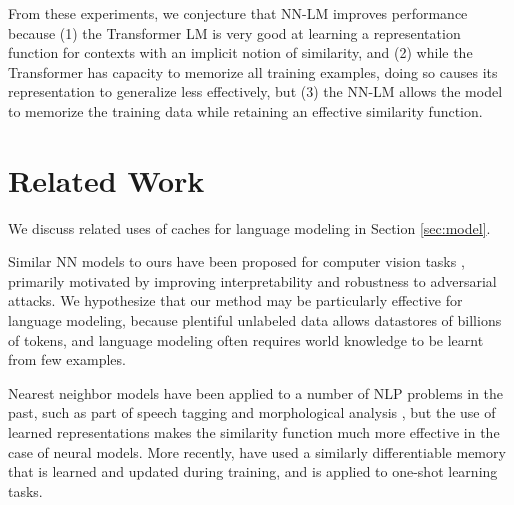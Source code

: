 \documentclass{article} \usepackage{iclr2020_conference,times}
\begin{document}
From these experiments, we conjecture that NN-LM improves performance because (1) the Transformer LM is very good at learning a representation function for contexts with an implicit notion of similarity, and (2) while the Transformer has capacity to memorize all training examples, doing so causes its representation to generalize less effectively, but (3) the NN-LM allows the model to memorize the training data while retaining an effective similarity function. 
























































%
 

\section{Related Work}
\label{sec:relwork}

We discuss related uses of caches for language modeling in Section \ref{sec:model}.

Similar NN models to ours have been proposed for computer vision tasks \citep{papernot2018deep,orhan2018simple,zhao2018retrieval}, primarily motivated by improving interpretability and robustness to adversarial attacks. 
We hypothesize that our method may be particularly effective for language modeling, because plentiful unlabeled data allows datastores of billions of tokens, and language modeling often requires world knowledge to be learnt from few examples.

Nearest neighbor models have been applied to a number of NLP problems in the past, such as part of speech tagging \citep{daelemans1996mbt} and morphological analysis \citep{bosch2007efficient}, but the use of learned representations makes the similarity function much more effective in the case of neural models. More recently, \citet{kaiser2017learning} have used a similarly differentiable memory that is learned and updated during training, and is applied to one-shot learning tasks.
\end{document}
